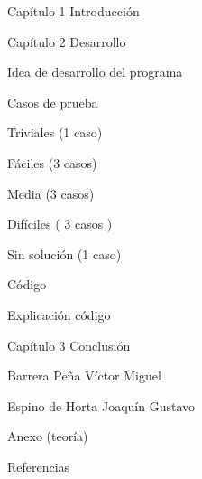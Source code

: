 \documentclass[
  spanish,
  ignorenonframetext,
]{beamer}
\begin{document}
\begin{frame}{Capítulo 1 Introducción}
\protect\hypertarget{capuxedtulo-1-introducciuxf3n-1}{}
\end{frame}

\begin{frame}{Capítulo 2 Desarrollo}
\protect\hypertarget{capuxedtulo-2-desarrollo}{}
\begin{block}{Idea de desarrollo del programa}
\protect\hypertarget{idea-de-desarrollo-del-programa}{}
\end{block}

\begin{block}{Casos de prueba}
\protect\hypertarget{casos-de-prueba}{}
\begin{block}{Triviales (1 caso)}
\protect\hypertarget{triviales-1-caso}{}
\end{block}

\begin{block}{Fáciles (3 casos)}
\protect\hypertarget{fuxe1ciles-3-casos}{}
\end{block}

\begin{block}{Media (3 casos)}
\protect\hypertarget{media-3-casos}{}
\end{block}

\begin{block}{Difíciles ( 3 casos )}
\protect\hypertarget{difuxedciles-3-casos}{}
\end{block}

\begin{block}{Sin solución (1 caso)}
\protect\hypertarget{sin-soluciuxf3n-1-caso}{}
\end{block}

\begin{block}{Código}
\protect\hypertarget{cuxf3digo}{}
\end{block}
\end{block}

\begin{block}{Explicación código}
\protect\hypertarget{explicaciuxf3n-cuxf3digo}{}
\end{block}
\end{frame}

\begin{frame}{Capítulo 3 Conclusión}
\protect\hypertarget{capuxedtulo-3-conclusiuxf3n}{}
\begin{block}{Barrera Peña Víctor Miguel}
\protect\hypertarget{barrera-peuxf1a-vuxedctor-miguel}{}
\end{block}

\begin{block}{Espino de Horta Joaquín Gustavo}
\protect\hypertarget{espino-de-horta-joaquuxedn-gustavo}{}
\end{block}
\end{frame}

\begin{frame}{Anexo (teoría)}
\protect\hypertarget{anexo-teoruxeda}{}
\end{frame}

\begin{frame}{Referencias}
\protect\hypertarget{referencias}{}
\end{frame}
\end{document}
